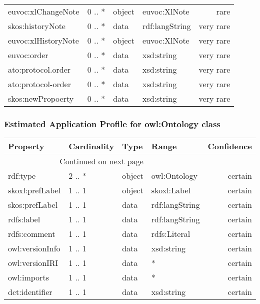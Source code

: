 \documentclass[10pt,a4paper,titlepage,final]{article}
\begin{document}
\begin{tabularx}{\textwidth}{lllXr}
     euvoc:xlChangeNote &      0 .. * &  object &                                       euvoc:XlNote &       rare \\
       skos:historyNote &      0 .. * &    data &                                     rdf:langString &  very rare \\
    euvoc:xlHistoryNote &      0 .. * &  object &                                       euvoc:XlNote &  very rare \\
            euvoc:order &      0 .. * &    data &                                         xsd:string &  very rare \\
     ato:protocol.order &      0 .. * &    data &                                         xsd:string &  very rare \\
     ato:protocol-order &      0 .. * &    data &                                         xsd:string &  very rare \\
      skos:newPropoerty &      0 .. * &    data &                                         xsd:string &  very rare \\
\end{tabularx}


\subsubsection{Estimated Application Profile for owl:Ontology class}
\begin{tabularx}{\textwidth}{lllXr}
\toprule
        Property & Cardinality &    Type &           Range & Confidence \\
\midrule
\endhead
\midrule
\multicolumn{3}{r}{{Continued on next page}} \\
\midrule
\endfoot

\bottomrule
\endlastfoot
        rdf:type &      2 .. * &  object &    owl:Ontology &    certain \\
 skoxl:prefLabel &      1 .. 1 &  object &     skoxl:Label &    certain \\
  skos:prefLabel &      1 .. 1 &    data &  rdf:langString &    certain \\
      rdfs:label &      1 .. 1 &    data &  rdf:langString &    certain \\
    rdfs:comment &      1 .. 1 &    data &    rdfs:Literal &    certain \\
 owl:versionInfo &      1 .. 1 &    data &      xsd:string &    certain \\
  owl:versionIRI &      1 .. 1 &    data &               * &    certain \\
     owl:imports &      1 .. 1 &    data &               * &    certain \\
  dct:identifier &      1 .. 1 &    data &      xsd:string &    certain \\
\end{tabularx}
\end{document}

